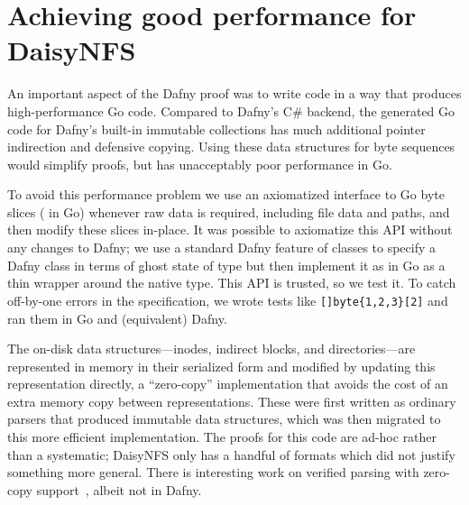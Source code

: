 

\begin{comment}
begin
    gsed -n '/method[^(]* [A-Z]*(/,/^\s*{/p' src/fs/dir_fs.dfy
    cat src/fs/nfs.s.dfy
end | wc -l
\end{comment}
%



\section{Achieving good performance for DaisyNFS}

An important aspect of the Dafny proof was to write code in a way that produces
high-performance Go code.
Compared to Dafny's C\# backend, the generated Go code for Dafny's built-in
immutable collections has much
additional pointer indirection and defensive copying. Using these data
structures for byte sequences would simplify proofs, but has unacceptably poor
performance in Go.

To avoid this performance problem we use an axiomatized interface to
Go byte slices ( in Go) whenever raw data is required, including file
data and paths, and then modify these slices in-place. It was possible to
axiomatize this API without any changes to Dafny; we use a standard Dafny
feature of  classes to specify a Dafny class  in terms of
ghost state of type  but then implement it as in Go as a thin
wrapper around the native  type. This API is trusted, so we
test it. To catch off-by-one errors in the specification, we wrote
tests like \verb![]byte{1,2,3}[2]! and ran them in Go and
(equivalent) Dafny.

The on-disk data structures---inodes, indirect blocks, and directories---are
represented in memory in their serialized form and modified by updating this
representation directly, a ``zero-copy'' implementation that avoids the cost of
an extra memory copy between representations. These were first written as
ordinary parsers that produced immutable data structures, which was then
migrated to this more efficient implementation. The proofs for this code are
ad-hoc rather than a systematic; DaisyNFS only has a handful of formats which
did not justify something more general. There is interesting work on
verified parsing with zero-copy support~\cite{swamy:everparse3d}, albeit not in Dafny.

